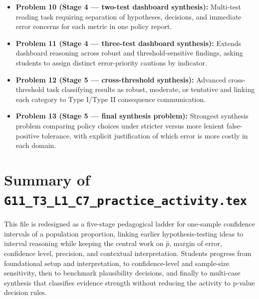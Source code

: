 \begin{itemize}
    \item \textbf{Problem 10 (Stage 4 --- two-test dashboard synthesis):} Multi-test reading task requiring separation of hypotheses, decisions, and immediate error concerns for each metric in one policy report.
    \item \textbf{Problem 11 (Stage 4 --- three-test dashboard synthesis):} Extends dashboard reasoning across robust and threshold-sensitive findings, asking students to assign distinct error-priority cautions by indicator.
    \item \textbf{Problem 12 (Stage 5 --- cross-threshold synthesis):} Advanced cross-threshold task classifying results as robust, moderate, or tentative and linking each category to Type I/Type II consequence communication.
    \item \textbf{Problem 13 (Stage 5 --- final synthesis problem):} Strongest synthesis problem comparing policy choices under stricter versus more lenient false-positive tolerance, with explicit justification of which error is more costly in each domain.
\end{itemize}

\section{Summary of \texttt{G11\_T3\_L1\_C7\_practice\_activity.tex}}
This file is redesigned as a five-stage pedagogical ladder for one-sample confidence intervals of a population proportion, linking earlier hypothesis-testing ideas to interval reasoning while keeping the central work on \(\hat p\), margin of error, confidence level, precision, and contextual interpretation. Students progress from foundational setup and interpretation, to confidence-level and sample-size sensitivity, then to benchmark plausibility decisions, and finally to multi-case synthesis that classifies evidence strength without reducing the activity to p-value decision rules.

